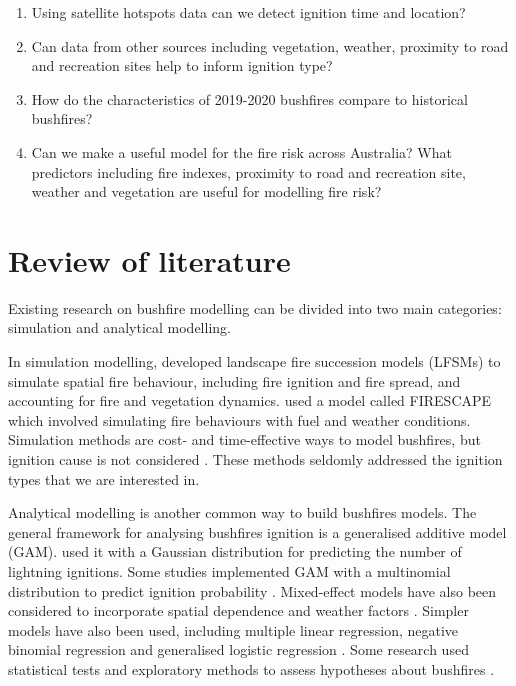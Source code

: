\documentclass[11pt,a4paper,]{article}
\providecommand{\tightlist}{%
  \setlength{\itemsep}{0pt}\setlength{\parskip}{0pt}}
\begin{document}
\begin{enumerate}
\def\labelenumi{\arabic{enumi}.}
\tightlist
\item
  Using satellite hotspots data can we detect ignition time and location?
\item
  Can data from other sources including vegetation, weather, proximity to road and recreation sites help to inform ignition type?
\item
  How do the characteristics of 2019-2020 bushfires compare to historical bushfires?
\item
  Can we make a useful model for the fire risk across Australia? What predictors including fire indexes, proximity to road and recreation site, weather and vegetation are useful for modelling fire risk?
\end{enumerate}

\hypertarget{review-of-literature}{%
\section{Review of literature}\label{review-of-literature}}

Existing research on bushfire modelling can be divided into two main categories: simulation and analytical modelling.

In simulation modelling, \textcite{keane2004classification} developed landscape fire succession models (LFSMs) to simulate spatial fire behaviour, including fire ignition and fire spread, and accounting for fire and vegetation dynamics. \textcite{bradstock2012wildfires} used a model called FIRESCAPE which involved simulating fire behaviours with fuel and weather conditions. Simulation methods are cost- and time-effective ways to model bushfires, but ignition cause is not considered \autocite{clarke2019developing}. These methods seldomly addressed the ignition types that we are interested in.

Analytical modelling is another common way to build bushfires models. The general framework for analysing bushfires ignition is a generalised additive model (GAM). \textcite{bates2018exploratory} used it with a Gaussian distribution for predicting the number of lightning ignitions. Some studies implemented GAM with a multinomial distribution to predict ignition probability \autocite{read2018lightning,zhang2017wildfire}. Mixed-effect models have also been considered to incorporate spatial dependence and weather factors \autocite{duff2018dryness}. Simpler models have also been used, including multiple linear regression, negative binomial regression and generalised logistic regression \autocite{cheney2012predicting,plucinski2014predicting,collins2015spatial}. Some research used statistical tests and exploratory methods to assess hypotheses about bushfires \autocite{miller2017electrically,dowdy2017pyrocumulonimbus}.
\end{document}
